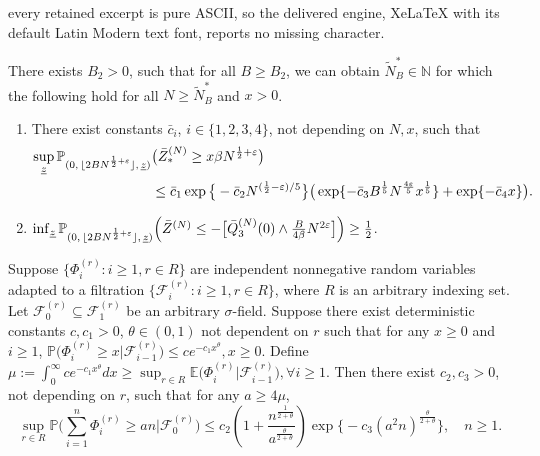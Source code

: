 \documentclass[10pt,a4paper]{amsart}
\begin{document}
every retained excerpt is pure ASCII, so the delivered engine, XeLaTeX with its default Latin Modern text font, reports no missing character.
\begin{lemma}\label{lem:LEMMA-8}
There exists $B_2>0$, such that for all $B\geq B_2$, we can obtain $\tilde N^*_B \in \mathbb{N}$ for which the following hold for all $N \geq \tilde N^*_B$ and $x>0$.
\begin{enumerate}[\normalfont (i)]
    \item There exist constants $\bar{c}_i$, $i\in\{1,2,3,4\}$, not depending on $N,x$, such that 
    \begin{equation}\label{eq:lem3.3-1}
        \begin{split}
            \sup_{\underline{z}}\mathbb{P}_{(0, \, \lfloor 2BN^{\frac{1}{2}+\varepsilon} \rfloor, \,\underline{z})}
        &\big(\Bar{Z}^{(N)}_{*}\geq x\beta N^{\frac{1}{2}+\varepsilon}\big)\\
        &\leq \bar{c}_1\exp \big\{-\bar{c}_2N^{(\frac{1}{2}-\varepsilon)/5}\big\}\big(\exp \{-\bar{c}_3B^{\frac{1}{5}}N^{\frac{4\varepsilon}{5}}x^{\frac{1}{5}}\}+\exp \{-\bar{c}_4x \}\big).
        \end{split}
    \end{equation}
    \item $\inf_{\underline{z}} \mathbb{P}_{(0, \, \lfloor 2BN^{\frac{1}{2}+\varepsilon} \rfloor, \,\underline{z})}\Big(\Bar{Z}^{(N)}\leq -\big[\Bar{Q}^{(N)}_3(0)\wedge \frac{B}{4\beta}N^{2\varepsilon}\big]\Big)\geq \frac{1}{2}$.
\end{enumerate}
\end{lemma}

\begin{lemma}\label{lem:LEMMA-5}
Suppose $\{\Phi^{(r)}_i:i\geq 1,r\in R\}$ are independent nonnegative random variables adapted to a filtration $\big\{\mathcal{F}^{(r)}_i:i\geq 1, r\in R\big\}$, where $R$ is an arbitrary indexing set. Let $\mathcal{F}^{(r)}_0\subseteq \mathcal{F}^{(r)}_1$ be an arbitrary $\sigma$-field. Suppose there exist deterministic constants $c,c_1>0$, $\theta \in (0,1)$ not dependent on $r$  such that for any $x\geq0$ and $i\geq 1$, $\mathbb{P}\big(\Phi^{(r)}_i\geq x|\mathcal{F}^{(r)}_{i-1}\big)\leq ce^{-c_1x^{\theta}},x\geq 0.$
Define $\mu :=\int_0^{\infty}ce^{-c_1x^{\theta}} dx\geq \sup_{r\in R}\mathbb{E}\big(\Phi^{(r)}_i|\mathcal{F}^{(r)}_{i-1}\big),\forall i\geq 1$.
Then there exist $c_2,c_3>0$, not depending on $r$, such that for any $a\geq 4\mu $,
$$\sup_{r\in R}\mathbb{P}\big(\sum_{i=1}^{n}\Phi^{(r)}_i \geq an|\mathcal{F}^{(r)}_0\big)\leq c_2\left(1+\frac{n^{\frac{1}{2+\theta}}}{a^{\frac{\theta}{2+\theta}}}\right)\exp \big\{-c_3(a^2n)^{\frac{\theta}{2+\theta}}\big\},\quad n\geq 1.$$
\end{lemma}
\end{document}

